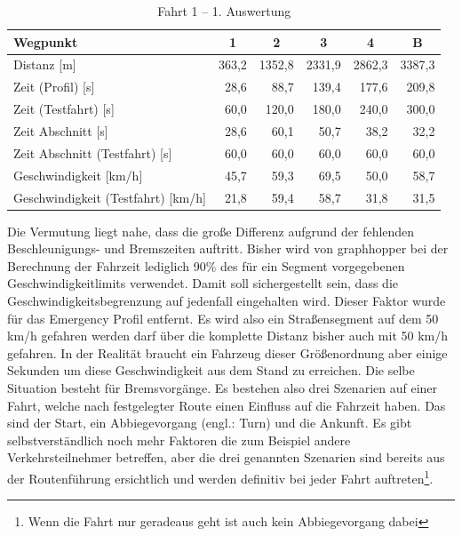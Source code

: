 \documentclass[12pt,a4paper]{article}
\begin{document}
\begin{table}[]
\centering
\caption{Fahrt 1 -- 1. Auswertung}
\label{tab:driveinit}
\begin{tabular}{|l|r|r|r|r|r|}
\hline
Wegpunkt                               & \multicolumn{1}{c|}{1} & \multicolumn{1}{c|}{2} & \multicolumn{1}{c|}{3} & \multicolumn{1}{c|}{4} & \multicolumn{1}{c|}{B}  \\ \hline
Distanz {[}m{]}                        & 363,2                  & 1352,8                 & 2331,9                 & 2862,3                 & 3387,3                 \\ \hline
Zeit (Profil) {[}s{]}                  & 28,6                   & 88,7                   & 139,4                  & 177,6                  & 209,8                  \\ \hline
Zeit (Testfahrt) {[}s{]}               & 60,0                   & 120,0                  & 180,0                  & 240,0                  & 300,0                  \\ \hline
Zeit Abschnitt {[}s{]}                 & 28,6                   & 60,1                   & 50,7                   & 38,2                   & 32,2                   \\ \hline
Zeit Abschnitt (Testfahrt) {[}s{]}     & 60,0                   & 60,0                   & 60,0                   & 60,0                   & 60,0                   \\ \hline
Geschwindigkeit {[}km/h{]}             & 45,7                   & 59,3                   & 69,5                   & 50,0                   & 58,7                   \\ \hline
Geschwindigkeit (Testfahrt) {[}km/h{]} & 21,8                   & 59,4                   & 58,7                   & 31,8                   & 31,5                   \\ \hline
\end{tabular}
\end{table}

Die Vermutung liegt nahe, dass die große Differenz aufgrund der fehlenden Beschleunigungs- und Bremszeiten auftritt. Bisher wird von graphhopper bei der Berechnung der Fahrzeit lediglich 90\% des für ein Segment vorgegebenen Geschwindigkeitlimits verwendet. Damit soll sichergestellt sein, dass die Geschwindigkeitsbegrenzung auf jedenfall eingehalten wird. Dieser Faktor wurde für das Emergency Profil entfernt.
Es wird also ein Straßensegment auf dem 50 km/h gefahren werden darf über die komplette Distanz bisher auch mit 50 km/h gefahren.
In der Realität braucht ein Fahrzeug dieser Größenordnung aber einige Sekunden um diese Geschwindigkeit aus dem Stand zu erreichen. Die selbe Situation besteht für Bremsvorgänge.
Es bestehen also drei Szenarien auf einer Fahrt, welche nach festgelegter Route einen Einfluss auf die Fahrzeit haben. Das sind der Start, ein Abbiegevorgang (engl.: Turn) und die Ankunft. Es gibt selbstverständlich noch mehr Faktoren die zum Beispiel andere Verkehrsteilnehmer betreffen, aber die drei genannten Szenarien sind bereits aus der Routenführung ersichtlich und werden definitiv bei jeder Fahrt auftreten\footnote{Wenn die Fahrt nur geradeaus geht ist auch kein Abbiegevorgang dabei}.
\end{document}
